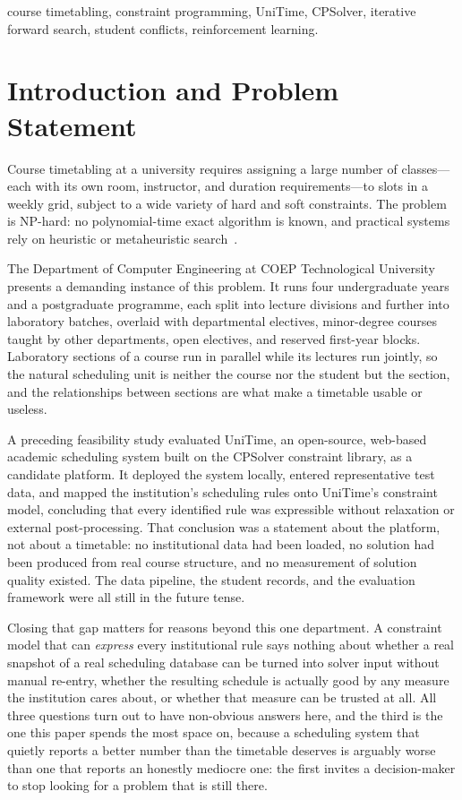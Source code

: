 \documentclass[journal]{IEEEtran}
\begin{document}
\begin{IEEEkeywords}
course timetabling, constraint programming, UniTime, CPSolver, iterative forward search, student conflicts, reinforcement learning.
\end{IEEEkeywords}

\section{Introduction and Problem Statement}
\label{sec:intro}

Course timetabling at a university requires assigning a large number of classes---each with its own room, instructor, and duration requirements---to slots in a weekly grid, subject to a wide variety of hard and soft constraints. The problem is NP-hard: no polynomial-time exact algorithm is known, and practical systems rely on heuristic or metaheuristic search~\cite{schaerf1999survey}.

The Department of Computer Engineering at COEP Technological University presents a demanding instance of this problem. It runs four undergraduate years and a postgraduate programme, each split into lecture divisions and further into laboratory batches, overlaid with departmental electives, minor-degree courses taught by other departments, open electives, and reserved first-year blocks. Laboratory sections of a course run in parallel while its lectures run jointly, so the natural scheduling unit is neither the course nor the student but the section, and the relationships between sections are what make a timetable usable or useless.

A preceding feasibility study evaluated UniTime, an open-source, web-based academic scheduling system built on the CPSolver constraint library, as a candidate platform. It deployed the system locally, entered representative test data, and mapped the institution's scheduling rules onto UniTime's constraint model, concluding that every identified rule was expressible without relaxation or external post-processing. That conclusion was a statement about the platform, not about a timetable: no institutional data had been loaded, no solution had been produced from real course structure, and no measurement of solution quality existed. The data pipeline, the student records, and the evaluation framework were all still in the future tense.

Closing that gap matters for reasons beyond this one department. A constraint model that can \emph{express} every institutional rule says nothing about whether a real snapshot of a real scheduling database can be turned into solver input without manual re-entry, whether the resulting schedule is actually good by any measure the institution cares about, or whether that measure can be trusted at all. All three questions turn out to have non-obvious answers here, and the third is the one this paper spends the most space on, because a scheduling system that quietly reports a better number than the timetable deserves is arguably worse than one that reports an honestly mediocre one: the first invites a decision-maker to stop looking for a problem that is still there.
\end{document}

